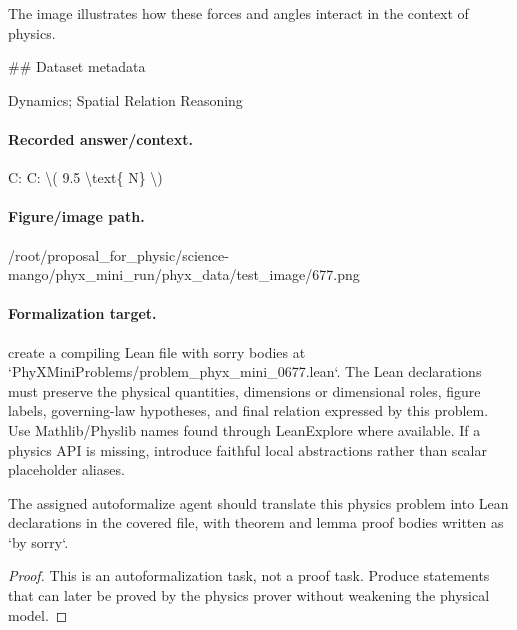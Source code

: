 The image illustrates how these forces and angles interact in the context of physics.

\#\# Dataset metadata

Dynamics; Spatial Relation Reasoning

\paragraph{Recorded answer/context.}
C: C: \textbackslash{}( 9.5 \textbackslash{}text\{ N\} \textbackslash{})

\paragraph{Figure/image path.}
/root/proposal\_for\_physic/science-mango/phyx\_mini\_run/phyx\_data/test\_image/677.png

\paragraph{Formalization target.}
create a compiling Lean file with sorry bodies at `PhyXMiniProblems/problem\_phyx\_mini\_0677.lean`. The Lean declarations must preserve the physical quantities, dimensions or dimensional roles, figure labels, governing-law hypotheses, and final relation expressed by this problem.
Use Mathlib/Physlib names found through LeanExplore where available. If a physics API is missing, introduce faithful local abstractions rather than scalar placeholder aliases.

\begin{theorem}
\label{thm:physics:phyx_mini_0677:target}
The assigned autoformalize agent should translate this physics problem into Lean declarations in the covered file, with theorem and lemma proof bodies written as `by sorry`.
\end{theorem}
\begin{proof}
This is an autoformalization task, not a proof task. Produce statements that can later be proved by the physics prover without weakening the physical model.
\end{proof}

